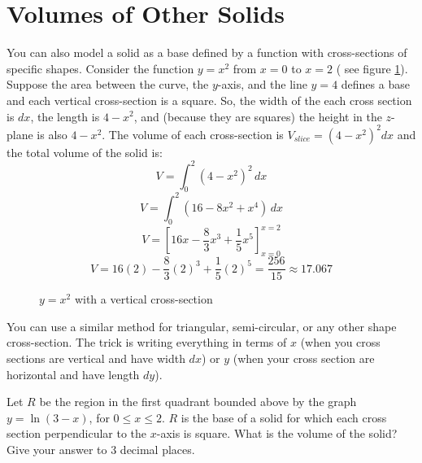 \section{Volumes of Other Solids}
You can also model a solid as a base defined by a function with cross-sections 
of specific shapes. Consider the function $y = x^2$ from $x = 0$ to $x = 2$ (
see figure \ref{fig:parab}). Suppose the area between the curve, the $y$-axis, 
and the line $y = 4$ defines a base and each vertical cross-section is a 
square. So, the width of the each cross section is $dx$, the length is $4 - 
x^2$, and (because they are squares) the height in the $z$-plane is also $4 - 
x^2$. The volume of each cross-section is $V_{slice} = \left(4 - x^2 
\right)^2 dx$ and the total volume of the solid is:
$$V = \int_0^2 \left(4 - x^2 \right) ^ 2\,dx$$
$$V = \int_0^2 \left( 16 - 8x^2 + x^4 \right)\,dx$$
$$V = \left[16x - \frac{8}{3}x^3 + \frac{1}{5}x^5 \right]_{x = 0}^{x = 2}$$
$$V = 16(2) - \frac{8}{3}(2)^3 + \frac{1}{5}(2)^5 = \frac{256}{15} 
\approx 17.067$$

\begin{figure}[htbp]
\centering
	\caption{$y = x^2$ with a vertical cross-section}
	\label{fig:parab} 
\end{figure}

You can use a similar method for triangular, semi-circular, or any other shape 
cross-section. The trick is writing everything in terms of $x$ (when you cross 
sections are vertical and have width $dx$) or $y$ (when your cross section are 
horizontal and have length $dy$). 

\begin{Exercise} Let $R$ be the region in the first 
quadrant bounded above by the graph $y = \ln{(3 - x)}$, for $0 \leq x \leq 2$. 
$R$ is the base of a solid for which each cross section perpendicular to the 
$x$-axis is square. What is the volume of the solid? Give your answer to 3 
decimal places. 
\vspace{50mm}
\end{Exercise}

